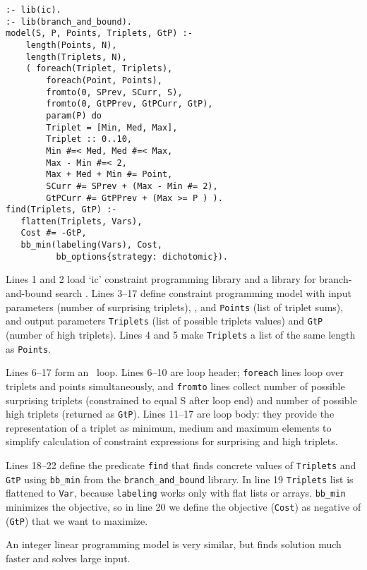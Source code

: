 \documentclass{acm_proc_article-sp}
\begin{document}
\begin{lstlisting}[caption={Constraint programming solution for ``Dancing With the Googlers''}]
:- lib(ic).
:- lib(branch_and_bound).
model(S, P, Points, Triplets, GtP) :-
    length(Points, N),
    length(Triplets, N),
    ( foreach(Triplet, Triplets), 
        foreach(Point, Points), 
        fromto(0, SPrev, SCurr, S), 
        fromto(0, GtPPrev, GtPCurr, GtP), 
        param(P) do
        Triplet = [Min, Med, Max],
        Triplet :: 0..10,
        Min #=< Med, Med #=< Max,
        Max - Min #=< 2,
        Max + Med + Min #= Point,
        SCurr #= SPrev + (Max - Min #= 2),
        GtPCurr #= GtPPrev + (Max >= P ) ).
find(Triplets, GtP) :-
   flatten(Triplets, Vars),
   Cost #= -GtP,
   bb_min(labeling(Vars), Cost, 
          bb_options{strategy: dichotomic}).
\end{lstlisting}

Lines 1 and 2 load `ic' constraint programming library and a library for branch-and-bound search \cite{eclipse-library-manual}.
Lines 3--17 define constraint programming model with input parameters  (number of surprising triplets), , and \texttt{Points} (list of triplet sums), 
and output parameters \texttt{Triplets} (list of possible triplets values) and \texttt{GtP} (number of high triplets).
Lines 4 and 5 make \texttt{Triplets} a list of the same length as \texttt{Points}.

Lines 6--17 form an \eclipse\ loop. Lines 6--10 are loop header; \texttt{foreach} lines loop over triplets and points simultaneously, and \texttt{fromto} lines collect number of possible surprising triplets (constrained to equal S after loop end) and number of possible high triplets (returned as \texttt{GtP}). Lines 11--17 are loop body: they provide the representation of a triplet as minimum, medium and maximum elements to simplify calculation of constraint expressions for surprising and high triplets.

Lines 18--22 define the predicate \texttt{find} that finds concrete values of \texttt{Triplets} and \texttt{GtP} using \texttt{bb\_min} from the \texttt{branch\_and\_bound} library.
In line 19 \texttt{Triplets} list is flattened to \texttt{Var}, because \texttt{labeling} works only with flat lists or arrays.
\texttt{bb\_min} minimizes the objective, so in line 20 we define the objective (\texttt{Cost}) as negative of (\texttt{GtP}) that we want to maximize.

An integer linear programming model is very similar, but finds solution much faster and solves large input.
\end{document}
